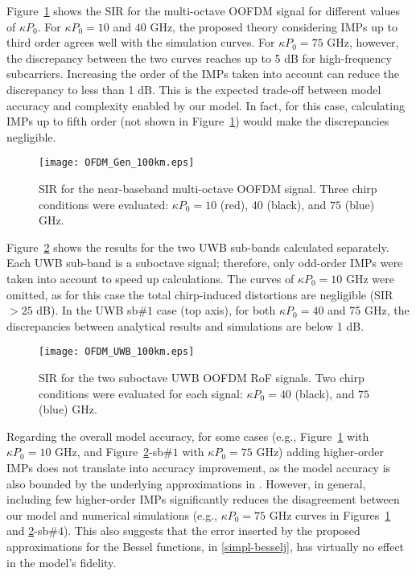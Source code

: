 \documentclass[journal]{IEEEtran}
\begin{document}
Figure~\ref{fig:SIR1} shows the SIR for the multi-octave OOFDM signal for different values of $\kappa P_0$. For $\kappa P_0 = 10$ and $40$ GHz, the proposed theory considering IMPs up to third order agrees well with the simulation curves. For $\kappa P_0 = 75$ GHz, however, the discrepancy between the two curves reaches up to 5 dB for high-frequency subcarriers. Increasing the order of the IMPs taken into account can reduce the discrepancy to less than 1 dB. This is the expected trade-off between model accuracy and complexity enabled by our model. In fact, for this case, calculating IMPs up to fifth order (not shown in Figure~\ref{fig:SIR1}) would make the discrepancies negligible.
\begin{figure}[t]
\centering
\texttt{[image: OFDM\_Gen\_100km.eps]}
\caption{SIR for the near-baseband multi-octave OOFDM signal. Three chirp conditions were evaluated: $\kappa P_0 = 10$ (red), 40 (black), and $75$ (blue) GHz.} \label{fig:SIR1}
\end{figure}

Figure~\ref{fig:SIR2} shows the results for the two UWB sub-bands calculated separately. Each UWB sub-band is a suboctave signal; therefore, only odd-order IMPs were taken into account to speed up calculations. The curves of $\kappa P_0 = 10$ GHz were omitted, as for this case the total chirp-induced distortions are negligible (SIR $> 25$ dB). In the UWB sb$\#1$ case (top axis), for both $\kappa P_0 = 40$ and 75 GHz, the discrepancies between analytical results and simulations are below 1 dB. 

\begin{figure}[t]
\centering
\texttt{[image: OFDM\_UWB\_100km.eps]}
\caption{SIR for the two suboctave UWB OOFDM RoF signals. Two chirp conditions were evaluated for each signal: $\kappa P_0 = 40$ (black), and $75$ (blue) GHz.} \label{fig:SIR2}
\end{figure}

Regarding the overall model accuracy, for some cases (e.g., Figure~\ref{fig:SIR1} with $\kappa P_0 = 10$ GHz, and Figure~\ref{fig:SIR2}-sb$\#1$ with $\kappa P_0 = 75$ GHz) adding higher-order IMPs does not translate into accuracy improvement, as the model accuracy is also bounded by the underlying approximations in \cite{eva}. However, in general, including few higher-order IMPs significantly reduces the disagreement between our model and numerical simulations (e.g., $\kappa P_0 = 75$ GHz curves in Figures~\ref{fig:SIR1} and \ref{fig:SIR2}-sb$\#4$). This also suggests that the error inserted by the proposed approximations for the Bessel functions, in \eqref{simpl-besselj}, has virtually no effect in the model's fidelity.
\end{document}
